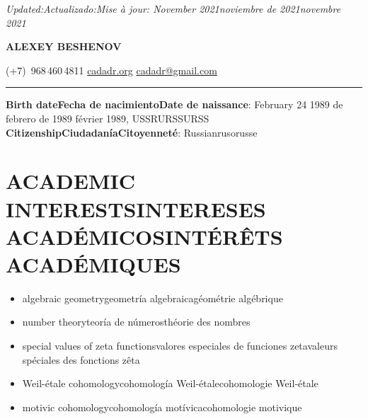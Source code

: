 \documentclass{article}
\newcommand{\biling}[3]{\ifdefined\english#1\fi\ifdefined\spanish#2\fi\ifdefined\french#3\fi}
\begin{document}
{\flushright\noindent\emph{\biling{Updated:}{Actualizado:}{Mise à jour:} \biling{November 2021}{noviembre de 2021}{novembre 2021}}

}

\begin{center}
{\LARGE\sffamily\bf ALEXEY BESHENOV}

\vspace{0.5em}

\faPhoneSquare{} (+7)~968\,460\,4811 \quad
\faGlobe{} \href{https://cadadr.org/}{cadadr.org} \quad
\faEnvelope{} \href{mailto:cadadr@gmail.com}{cadadr@gmail.com} \\



\vspace{1em}

\rule{14cm}{1pt}

\end{center}

\vspace{1em}


\noindent \textbf{\biling{Birth date}{Fecha de nacimiento}{Date de naissance}}: \biling{February 24 1989}{24 de febrero de 1989}{24 février 1989}, \biling{USSR}{URSS}{URSS} \\
\textbf{\biling{Citizenship}{Ciudadanía}{Citoyenneté}}: \biling{Russian}{ruso}{russe}

{\color{RoyalBlue}\section*{\biling{ACADEMIC INTERESTS}{INTERESES ACADÉMICOS}{INTÉRÊTS ACADÉMIQUES}}}

\begin{itemize}
\item\biling{algebraic geometry}{geometría algebraica}{géométrie algébrique}
\item \biling{number theory}{teoría de números}{théorie des nombres}
\item \biling{special values of zeta functions}{valores especiales de funciones zeta}{valeurs spéciales des fonctions zêta}
\item \biling{Weil-étale cohomology}{cohomología Weil-étale}{cohomologie Weil-étale}
\item \biling{motivic cohomology}{cohomología motívica}{cohomologie motivique}
\end{itemize}
\end{document}
